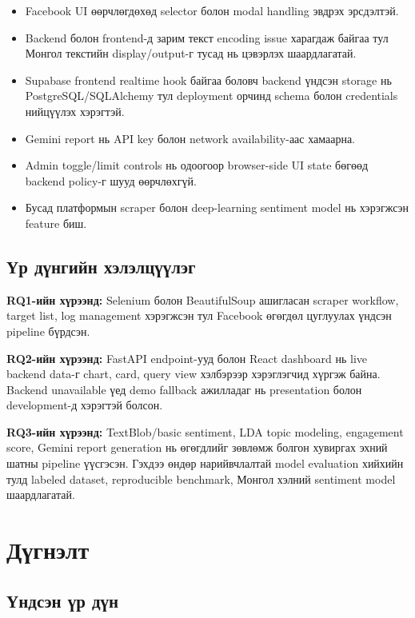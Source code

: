 \documentclass[
12pt,
oneside,
english,
onehalfspacing,
nolistspacing,
headsepline,
]{MUST-Thesis}
\begin{document}
\begin{itemize}
    \item Facebook UI өөрчлөгдөхөд selector болон modal handling эвдрэх эрсдэлтэй.
    \item Backend болон frontend-д зарим текст encoding issue харагдаж байгаа тул Монгол текстийн display/output-г тусад нь цэвэрлэх шаардлагатай.
    \item Supabase frontend realtime hook байгаа боловч backend үндсэн storage нь PostgreSQL/SQLAlchemy тул deployment орчинд schema болон credentials нийцүүлэх хэрэгтэй.
    \item Gemini report нь API key болон network availability-аас хамаарна.
    \item Admin toggle/limit controls нь одоогоор browser-side UI state бөгөөд backend policy-г шууд өөрчлөхгүй.
    \item Бусад платформын scraper болон deep-learning sentiment model нь хэрэгжсэн feature биш.
\end{itemize}

\section{Үр дүнгийн хэлэлцүүлэг}

\textbf{RQ1-ийн хүрээнд:} Selenium болон BeautifulSoup ашигласан scraper workflow, target list, log management хэрэгжсэн тул Facebook өгөгдөл цуглуулах үндсэн pipeline бүрдсэн.

\textbf{RQ2-ийн хүрээнд:} FastAPI endpoint-ууд болон React dashboard нь live backend data-г chart, card, query view хэлбэрээр хэрэглэгчид хүргэж байна. Backend unavailable үед demo fallback ажилладаг нь presentation болон development-д хэрэгтэй болсон.

\textbf{RQ3-ийн хүрээнд:} TextBlob/basic sentiment, LDA topic modeling, engagement score, Gemini report generation нь өгөгдлийг зөвлөмж болгон хувиргах эхний шатны pipeline үүсгэсэн. Гэхдээ өндөр нарийвчлалтай model evaluation хийхийн тулд labeled dataset, reproducible benchmark, Монгол хэлний sentiment model шаардлагатай.

\chapter{Дүгнэлт}

\section{Үндсэн үр дүн}
\end{document}
